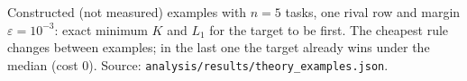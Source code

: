 \begin{table}[t]
\caption{Constructed (not measured) examples with $n=5$ tasks, one rival row and margin $\varepsilon=10^{-3}$: exact minimum $K$ and $L_1$ for the target to be first. The cheapest rule changes between examples; in the last one the target already wins under the median (cost 0). Source: \texttt{analysis/results/theory\_examples.json}.}
\label{tab:counter}
\centering\scriptsize\setlength{\tabcolsep}{3pt}

\end{table}
